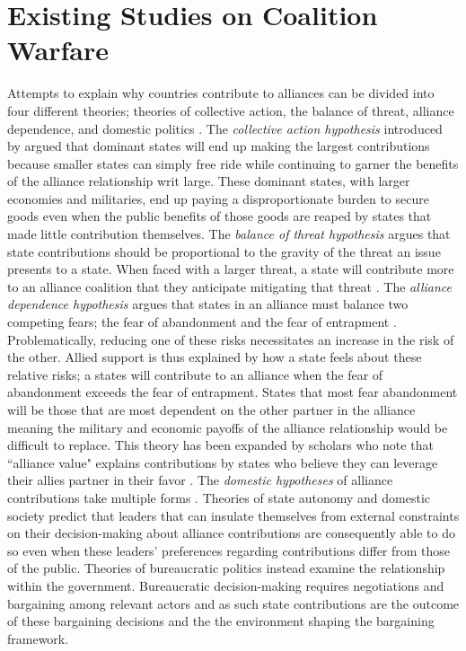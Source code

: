 \documentclass[12pt,letterpaper]{article}
\begin{document}
\section{Existing Studies on Coalition Warfare}
	Attempts to explain why countries contribute to alliances can be divided into four different theories; theories of collective action, the balance of threat, alliance dependence, and domestic politics \citep{bennett_burdensharingpersiangulf_1994, haesebrouck_democraticparticipationair_2016}. The \textit{collective action hypothesis} introduced by \citet{olson_economictheoryalliances_1966} argued that dominant states will end up making the largest contributions because smaller states can simply free ride while continuing to garner the benefits of the alliance relationship writ large. These dominant states, with larger economies and militaries, end up paying a disproportionate burden to secure goods even when the public benefits of those goods are reaped by states that made little contribution themselves. The \textit{balance of threat hypothesis} argues that state contributions should be proportional to the gravity of the threat an issue presents to a state. When faced with a larger threat, a state will contribute more to an alliance coalition that they anticipate mitigating that threat \citep{walt_originsalliance_1987, sandler_natoburdensharing_2014}. The \textit{alliance dependence hypothesis} argues that states in an alliance must balance two competing fears; the fear of abandonment and the fear of entrapment \citep{snyder_securitydilemmaalliance_1984}. Problematically, reducing one of these risks necessitates an increase in the risk of the other. Allied support is thus explained by how a state feels about these relative risks; a states will contribute to an alliance when the fear of abandonment exceeds the fear of entrapment. States that most fear abandonment will be those that are most dependent on the other partner in the alliance meaning the military and economic payoffs of the alliance relationship would be difficult to replace. This theory has been expanded by scholars who note that ``alliance value" explains contributions by states who believe they can leverage their allies partner in their favor \citep{davidson_neoclassicalrealistexplanation_2011}. The \textit{domestic hypotheses} of alliance contributions take multiple forms \citep{ashraf_politicscoalitionburdensharing_2011}. Theories of state autonomy and domestic society predict that leaders that can insulate themselves from external constraints on their decision-making about alliance contributions are consequently able to do so even when these leaders' preferences regarding contributions differ from those of the public. Theories of bureaucratic politics instead examine the relationship within the government. Bureaucratic decision-making requires negotiations and bargaining among relevant actors and as such state contributions are the outcome of these bargaining decisions and the the environment shaping the bargaining framework.
\end{document}
